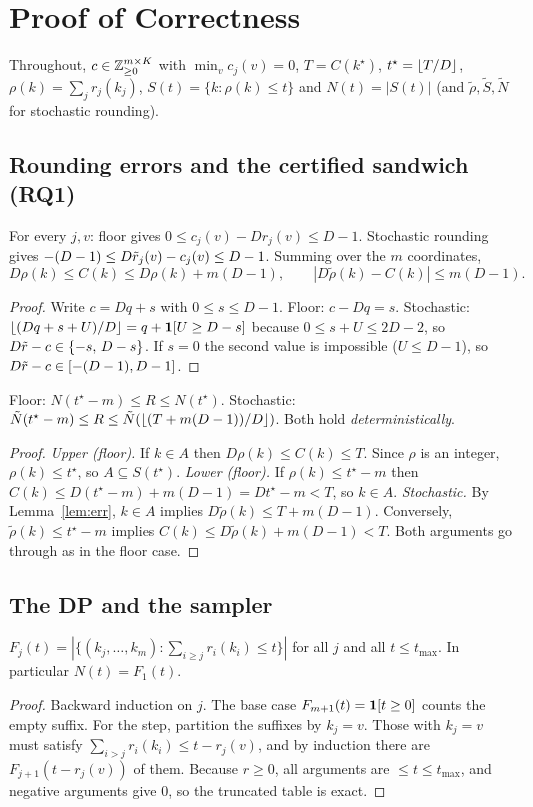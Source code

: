 \section{Proof of Correctness}\label{sec:proof}
Throughout, $c\in\mathbb{Z}_{\ge0}^{m\times K}$ with $\min_vc_j(v)=0$, $T=C(k^\star)$, $t^\star=\lfloor T/D\rfloor$,
$\rho(k)=\sum_jr_j(k_j)$, $S(t)=\{k:\rho(k)\le t\}$ and $N(t)=|S(t)|$ (and $\tilde\rho,\tilde S,\tilde N$ for stochastic rounding).

\subsection{Rounding errors and the certified sandwich (RQ1)}
\begin{lemma}\label{lem:err}
For every $j,v$: floor gives $0\le c_j(v)-D r_j(v)\le D-1$. Stochastic rounding gives
$-(D-1)\le D\tilde r_j(v)-c_j(v)\le D-1$. Summing over the $m$ coordinates,
\[ D\rho(k)\le C(k)\le D\rho(k)+m(D-1),\qquad |D\tilde\rho(k)-C(k)|\le m(D-1). \]
\end{lemma}
\begin{proof}
Write $c=Dq+s$ with $0\le s\le D-1$. Floor: $c-Dq=s$. Stochastic: $\lfloor(Dq+s+U)/D\rfloor=q+\mathbf{1}[U\ge D-s]$
because $0\le s+U\le 2D-2$, so $D\tilde r-c\in\{-s,\,D-s\}$. If $s=0$ the second value is impossible
($U\le D-1$), so $D\tilde r-c\in[-(D-1),D-1]$.
\end{proof}

\begin{lemma}[Sandwich]\label{lem:sandwich}
Floor: $N(t^\star-m)\le R\le N(t^\star)$. Stochastic:
$\tilde N(t^\star-m)\le R\le\tilde N(\lfloor(T+m(D-1))/D\rfloor)$. Both hold \emph{deterministically}.
\end{lemma}
\begin{proof}
\emph{Upper (floor).} If $k\in A$ then $D\rho(k)\le C(k)\le T$. Since $\rho$ is an integer, $\rho(k)\le t^\star$, so $A\subseteq S(t^\star)$.
\emph{Lower (floor).} If $\rho(k)\le t^\star-m$ then $C(k)\le D(t^\star-m)+m(D-1)=Dt^\star-m<T$, so $k\in A$.
\emph{Stochastic.} By Lemma~\ref{lem:err}, $k\in A$ implies $D\tilde\rho(k)\le T+m(D-1)$. Conversely, $\tilde\rho(k)\le t^\star-m$ implies $C(k)\le D\tilde\rho(k)+m(D-1)<T$. Both arguments go through as in the floor case.
\end{proof}

\subsection{The DP and the sampler}
\begin{lemma}[DP correctness]\label{lem:dp}
$F_j(t)=|\{(k_j,\dots,k_m):\sum_{i\ge j}r_i(k_i)\le t\}|$ for all $j$ and all $t\le t_{\max}$. In particular $N(t)=F_1(t)$.
\end{lemma}
\begin{proof}
Backward induction on $j$. The base case $F_{m+1}(t)=\mathbf{1}[t\ge0]$ counts the empty suffix.
For the step, partition the suffixes by $k_j=v$. Those with $k_j=v$ must satisfy $\sum_{i>j}r_i(k_i)\le t-r_j(v)$,
and by induction there are $F_{j+1}(t-r_j(v))$ of them. Because $r\ge0$, all arguments are
$\le t\le t_{\max}$, and negative arguments give $0$, so the truncated table is exact.
\end{proof}

